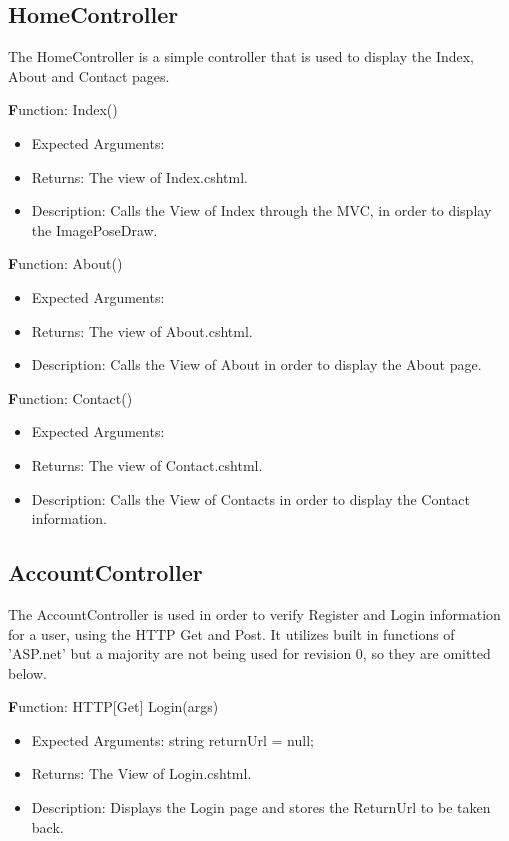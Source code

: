 \documentclass{scrreprt}
\begin{document}
\subsection{HomeController}
The HomeController is a simple controller that is used to display the Index, About and Contact pages.

  \textbf Function: Index()
  \begin{itemize}
    \item Expected Arguments:

    \item Returns:
    The view of Index.cshtml.
    \item Description:
    Calls the View of Index through the MVC, in order to display the ImagePoseDraw.
  \end{itemize}

  \textbf Function: About()
  \begin{itemize}
  \item Expected Arguments:

    \item Returns:
    The view of About.cshtml.
    \item Description:
    Calls the View of About in order to display the About page.
  \end{itemize}

  \textbf Function: Contact()
  \begin{itemize}
    \item Expected Arguments:

    \item Returns:
    The view of Contact.cshtml.
    \item Description:
    Calls the View of Contacts in order to display the Contact information.
  \end{itemize}

\subsection{AccountController}
The AccountController is used in order to verify Register and Login information for a user, using the HTTP Get and Post. It utilizes built in functions of 'ASP.net' but a majority are not being used for revision 0, so they are omitted below.

  \textbf Function:  HTTP[Get] Login(args)
  \begin{itemize}
    \item Expected Arguments:
    string returnUrl = null;
    \item Returns:
    The View of Login.cshtml.
    \item Description:
    Displays the Login page and stores the ReturnUrl to be taken back.
  \end{itemize}
\end{document}
